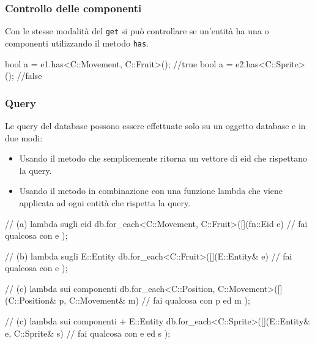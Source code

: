 \subsubsection{Controllo delle componenti}
Con le stesse modalità del \texttt{get} si può controllare se un'entità ha una o componenti utilizzando il metodo \texttt{has}.
\begin{cpp}
bool a = e1.has<C::Movement, C::Fruit>(); //true 
bool a = e2.has<C::Sprite>(); //false  
\end{cpp}



\subsubsection{Query}
Le query del database possono essere effettuate solo su un oggetto database e in due modi:
\begin{itemize}
\item Usando il metodo  che semplicemente ritorna un vettore di eid che rispettano la query.
\item Usando il metodo  in combinazione con una funzione lambda che viene applicata ad ogni entità che rispetta la query.
\end{itemize}

\begin{cpp}[caption={
		I vari metodi sono in realtà tutti equivalenti dal punto di vista funzionale, da quello delle performace invece l'iterazione su un sottoinsieme di componenti è sicuramente la scelta migliore.
		\\\\
		Un'ulteriore vantaggio di questo approccio è la possibilità di creare lambda (ad esempio all'interno di eventi di gioco) da applicare alle entità.
	}, captionpos=t]
 // (a) lambda sugli eid
 db.for_each<C::Movement, C::Fruit>([](fn::Eid e){
	// fai qualcosa con e	
 }); 

 // (b) lambda sugli E::Entity
 db.for_each<C::Fruit>([](E::Entity& e){
	// fai qualcosa con e
 }); 
 
 // (c) lambda sui componenti
 db.for_each<C::Position, C::Movement>([](C::Position& p, 
                                          C::Movement& m){
	// fai qualcosa con p ed m
 }); 

 // (c) lambda sui componenti + E::Entity
 db.for_each<C::Sprite>([](E::Entity& e, C::Sprite& s){
	// fai qualcosa con e ed s
 }); 
\end{cpp}





